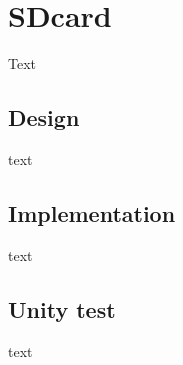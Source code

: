 \section{SDcard}
Text

\subsection{Design}
text

\subsection{Implementation}
text

\subsection{Unity test}
text